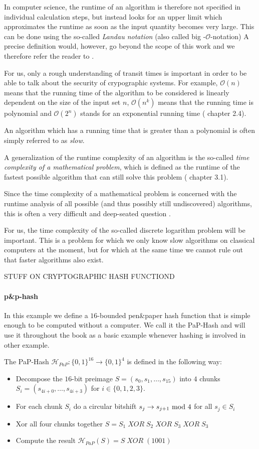 In computer science, the runtime of an algorithm is therefore not specified in individual calculation steps, but instead looks for an upper limit which approximates the runtime as soon as the input quantity becomes very large. This can be done using the so-called \textit{Landau notation} (also called big -$\mathcal{O}$-notation) A precise definition
would, however, go beyond the scope of this work and we therefore refer the reader to 
.

For us, only a rough understanding of transit times is important in order to be able to talk about the security of crypographic systems. For example, $\mathcal{O}(n)$ means that the running time of the algorithm to be considered is linearly dependent on the size of the input set $n$, $\mathcal{O}(n^k)$ means that the running time is polynomial and $\mathcal{O}(2^n) $ stands for an exponential running time (%
chapter 2.4).


An algorithm which has a running time that is greater than a polynomial is often simply referred to as \textit{slow}.

A generalization of the runtime complexity of an algorithm is the so-called \textit{time complexity of a mathematical problem}, which is defined as the runtime of the fastest possible algorithm that can still solve this problem (
chapter 3.1).

Since the time complexity of a mathematical problem is concerned with the runtime analysis of all possible (and thus possibly still undiscovered) algorithms, this is often a very difficult and deep-seated question .

For us, the time complexity of the so-called discrete logarithm problem will be important. This is a problem for which we only know slow algorithms on classical computers at the moment, but for which at the same time we cannot rule out that faster algorithms also exist.
 

STUFF ON CRYPTOGRAPHIC HASH FUNCTIOND

\paragraph{p\&{}p-hash}
In this example we define a $16$-bounded pen\&{}paper hash function that is simple enough to be computed without a computer. We call it the PaP-Hash and will use it throughout the book as a basic example whenever hashing is involved in other example.

The PaP-Hash $\mathcal{H}_{PaP}: \{0,1\}^{16}\to \{0,1\}^4$ is defined in the following way:
\begin{itemize}
\item Decompose the $16$-bit preimage $S=(s_0,s_1,\ldots,s_{15})$ into $4$ chunks $S_i=(s_{4i+0},\ldots,s_{4i+3})$ for $i\in \{0,1,2,3\}$.
\item For each chunk $S_i$ do a circular bitshift $s_{j}\to s_{j+1} \text{ mod } 4$ for all $s_j\in S_i$
\item Xor all four chunks together $S = S_1\; XOR \; S_2\; XOR \; S_3\; XOR \; S_3$
\item Compute the result $\mathcal{H}_{PaP}(S) = S \; XOR\; (1001)$
\end{itemize}

